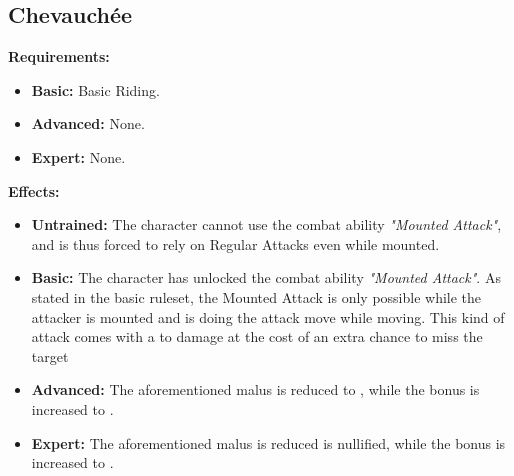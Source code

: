 \subsection{Chevauchée}
\begin{table}[!ht]
\centering
{}
\end{table}
\textbf{Requirements:}
\begin{itemize}
	\item \textbf{Basic:} Basic Riding.
	\item \textbf{Advanced:} None.
	\item \textbf{Expert:} None.
\end{itemize}
\textbf{Effects:}
\begin{itemize}
	\item \textbf{Untrained:} The character cannot use the combat ability \textit{"Mounted Attack"}, and is thus forced to rely on Regular Attacks even while mounted.
	\item \textbf{Basic:} The character has unlocked the combat ability \textit{"Mounted Attack"}. As stated in the basic ruleset, the Mounted Attack is only possible while the attacker is mounted and is doing the attack move while moving. This kind of attack comes with a  to damage at the cost of an extra  chance to miss the target
	\item \textbf{Advanced:} The aforementioned malus is reduced to , while the bonus is increased to .
	\item \textbf{Expert:} The aforementioned malus is reduced is nullified, while the bonus is increased to .
\end{itemize}\newpage
